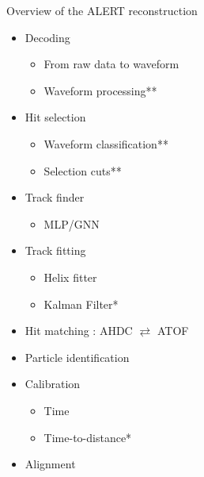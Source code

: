 \documentclass[10pt,aspectratio=43]{beamer}
\begin{document}
\begin{frame}{Overview of the ALERT reconstruction}

    \centering

    \begin{minipage}{0.45\textwidth}
        \begin{itemize}
            \item Decoding
                \begin{itemize}
                    \item From raw data to waveform
                    \item Waveform processing**
                \end{itemize}
            \item Hit selection
                \begin{itemize}
                    \item Waveform classification**
                    \item Selection cuts**
                \end{itemize}
            \item Track finder
                \begin{itemize}
                    \item MLP/GNN
                \end{itemize}
            \item Track fitting
                \begin{itemize}
                    \item Helix fitter
                    \item Kalman Filter*
                \end{itemize}
            \item Hit matching : AHDC $\rightleftarrows$ ATOF
            \item Particle identification
        \end{itemize}
    \end{minipage}
    \begin{minipage}{0.48\textwidth}
        \begin{itemize}
            \item Calibration
                \begin{itemize}
                    \item Time
                    \item Time-to-distance*
                \end{itemize}
            \item Alignment

\end{itemize}
\end{minipage}
\end{frame}
\end{document}

